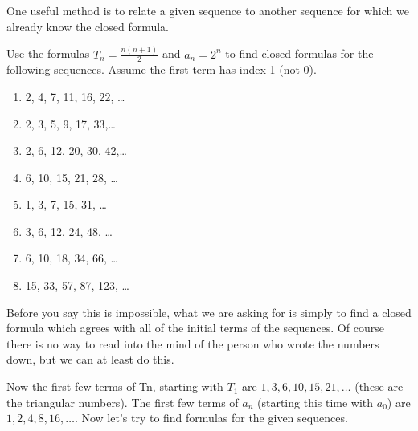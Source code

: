 \documentclass[12pt]{article}
\begin{document}
One useful method is to relate a given sequence to another sequence for which we already know the closed formula.

\begin{example}
  Use the formulas $T_n = \frac{n(n+1)}{2}$ and $a_n = 2^n$ to find closed formulas for the following sequences.  Assume the first term has index 1 (not 0).
  \begin{enumerate}
    \item 2, 4, 7, 11, 16, 22, \ldots
    \item 2, 3, 5, 9, 17, 33,\ldots
    \item 2, 6, 12, 20, 30, 42,\ldots
    \item 6, 10, 15, 21, 28, \ldots
    \item 1, 3, 7, 15, 31, \ldots
    \item 3, 6, 12, 24, 48, \ldots
    \item 6, 10, 18, 34, 66, \ldots
    \item 15, 33, 57, 87, 123, \ldots
  \end{enumerate}

\begin{solution}
  Before you say this is impossible, what we are asking for is simply to find a closed formula which agrees with all of the initial terms of the sequences.  Of course there is no way to read into the mind of the person who wrote the numbers down, but we can at least do this.
  
  Now the first few terms of \gls{Tn}, starting with $T_1$ are $1, 3, 6, 10, 15, 21, \ldots$ (these are the triangular numbers).  The first few terms of $a_n$ (starting this time with $a_0$) are $1, 2, 4, 8, 16, \ldots$.  Now let's try to find formulas for the given sequences.
  

\end{solution}
\end{example}
\end{document}
